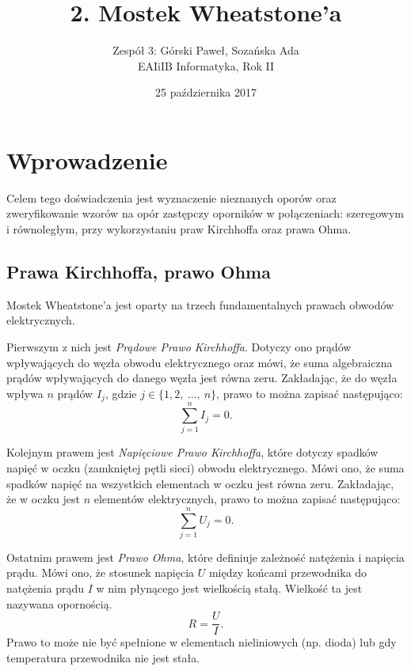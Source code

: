 \documentclass[12pt,a4paper]{article}
\title{2. Mostek Wheatstone'a}
\date{25 października 2017}
\author{
	Zespół 3: Górski Paweł, Sozańska Ada\\
	EAIiIB Informatyka, Rok II
}
\numberwithin{equation}{section}
\begin{document}
\maketitle
\section{Wprowadzenie}
Celem tego doświadczenia jest wyznaczenie nieznanych oporów oraz zweryfikowanie wzorów na opór zastępczy oporników w połączeniach: szeregowym i równoległym, przy wykorzystaniu praw Kirchhoffa oraz prawa Ohma.

\subsection{Prawa Kirchhoffa, prawo Ohma}

Mostek Wheatstone'a jest oparty na trzech fundamentalnych prawach obwodów elektrycznych.

Pierwszym z nich jest \emph{Prądowe Prawo Kirchhoffa}. Dotyczy ono prądów wpływających do węzła obwodu elektrycznego oraz mówi, że suma algebraiczna prądów wpływających do danego węzła jest równa zeru. Zakładając, że do węzła wpływa $n$ prądów $I_j$, gdzie $j \in \{1,2,~\ldots,~n\}$, prawo to można zapisać następująco:
\begin{equation}
	\sum_{j = 1}^{n} I_j = 0.
	\label{krichoff1}
\end{equation}

\pagebreak
Kolejnym prawem jest \emph{Napięciowe Prawo Kirchhoffa}, które dotyczy spadków napięć w oczku (zamkniętej pętli sieci) obwodu elektrycznego. Mówi ono, że suma spadków napięć na wszystkich elementach w oczku jest równa zeru. Zakładając, że w oczku jest $n$ elementów elektrycznych, prawo to można zapisać następująco:
\begin{equation}
	\sum_{j = 1}^{n} U_j = 0.
	\label{krichoff2}
\end{equation}

Ostatnim prawem jest \emph{Prawo Ohma}, które definiuje zależność natężenia i napięcia prądu. Mówi ono, że stosunek napięcia $U$ między końcami przewodnika do natężenia prądu $I$ w nim płynącego jest wielkością stałą. Wielkość ta jest nazywana opornością. 
\begin{equation}
	R = \frac{U}{I}.
	\label{ohm}
\end{equation}
Prawo to może nie być spełnione w elementach nieliniowych (np. dioda) lub gdy temperatura przewodnika nie jest stała.

\pagebreak
\end{document}
